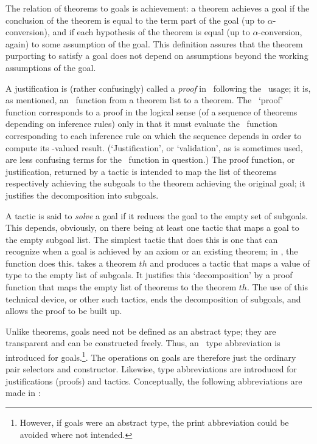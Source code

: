 The relation of theorems
to goals is achievement:
 a theorem achieves a goal if the conclusion
of the theorem is equal to the term part of the goal
(up to $\alpha$-conversion), and if each hypothesis of the theorem
is equal (up to $\alpha$-conversion, again) to some assumption of the
goal. This definition assures that the theorem purporting to satisfy a goal
does not depend on assumptions beyond the
working assumptions of the goal.

A justification is (rather confusingly) called
a {\it proof\/}
in \HOL\, following the \LCF\ usage; it is, as mentioned,
an \ML\ function
from a theorem list to a theorem.  The \ML\ `proof' function
corresponds to a proof
 in the
logical sense (of a sequence of theorems depending on inference rules)
only in that it must
evaluate the \ML\ function corresponding
to each inference rule on which the sequence depends
in order to compute its -valued result. (`Justification', or
`validation',
 as is sometimes used, are less confusing terms for
the \ML\ function in question.)
The proof function, or justification, returned by a tactic is intended to map the
list of theorems respectively achieving the subgoals to the
theorem achieving the original goal; it justifies the decomposition
into subgoals.

A tactic is said to {\it solve\/}
 a goal if it reduces the goal to the
empty set of subgoals.
This depends, obviously, on there being at least one
tactic that maps a goal to the empty subgoal list.  The simplest
tactic that does this is one that can recognize when a goal is
achieved by an axiom or an existing theorem; in \HOL, the function
 does this.  takes a theorem $th$
and produces a tactic that maps a value
of type  to the empty list of subgoals. It justifies this
`decomposition' by a proof function that maps the empty list of theorems
to the theorem $th$. The use of this technical device, or other
such tactics, ends the decomposition of subgoals, and allows the proof
to be built up.

Unlike theorems, goals need not be defined as an abstract type; they
are transparent and can be constructed freely. Thus, an \ML\ type
abbreviation is introduced for goals.\footnote{However, if goals were
  an abstract type, the print abbreviation could be avoided where not
  intended.}.  The operations on goals are therefore just the ordinary
pair selectors and constructor.
Likewise, type abbreviations are introduced for justifications
(proofs) and tactics. Conceptually, the following abbreviations are
made in \HOL:

